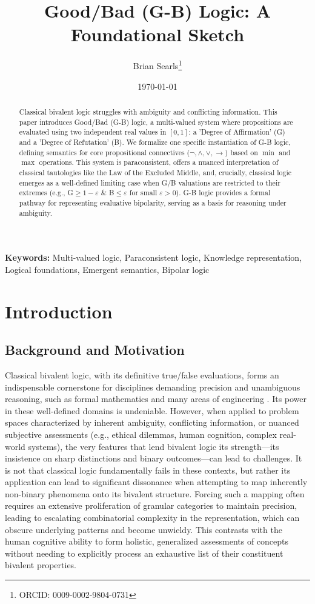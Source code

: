 \documentclass[11pt]{article}
\title{Good/Bad (G-B) Logic: A Foundational Sketch}
\author{Brian Searls\thanks{ORCID: 0009-0002-9804-0731}} %
\date{\today}
\theoremstyle{remark}
\begin{document}
\maketitle

\begin{abstract}
Classical bivalent logic struggles with ambiguity and conflicting information. This paper introduces Good/Bad (G-B) logic, a multi-valued system where propositions are evaluated using two independent real values in $[0,1]$: a 'Degree of Affirmation' (G) and a 'Degree of Refutation' (B). We formalize one specific instantiation of G-B logic, defining semantics for core propositional connectives ($\neg, \land, \lor, \rightarrow$) based on $\min$ and $\max$ operations. This system is paraconsistent, offers a nuanced interpretation of classical tautologies like the Law of the Excluded Middle, and, crucially, classical logic emerges as a well-defined limiting case when G/B valuations are restricted to their extremes (e.g., G$\ge 1-\varepsilon$ \& B$\le\varepsilon$ for small $\varepsilon > 0$). G-B logic provides a formal pathway for representing evaluative bipolarity, serving as a basis for reasoning under ambiguity.
\end{abstract}

\textbf{Keywords:} Multi-valued logic, Paraconsistent logic, Knowledge representation, Logical foundations, Emergent semantics, Bipolar logic

\tableofcontents
\newpage

\section{Introduction}

\subsection{Background and Motivation}
Classical bivalent logic, with its definitive true/false evaluations, forms an indispensable cornerstone for disciplines demanding precision and unambiguous reasoning, such as formal mathematics and many areas of engineering \cite{boole1854}. Its power in these well-defined domains is undeniable. However, when applied to problem spaces characterized by inherent ambiguity, conflicting information, or nuanced subjective assessments (e.g., ethical dilemmas, human cognition, complex real-world systems), the very features that lend bivalent logic its strength—its insistence on sharp distinctions and binary outcomes—can lead to challenges. It is not that classical logic fundamentally fails in these contexts, but rather its application can lead to significant dissonance when attempting to map inherently non-binary phenomena onto its bivalent structure. Forcing such a mapping often requires an extensive proliferation of granular categories to maintain precision, leading to escalating combinatorial complexity in the representation, which can obscure underlying patterns and become unwieldy. This contrasts with the human cognitive ability to form holistic, generalized assessments of concepts without needing to explicitly process an exhaustive list of their constituent bivalent properties. 
\end{document}
